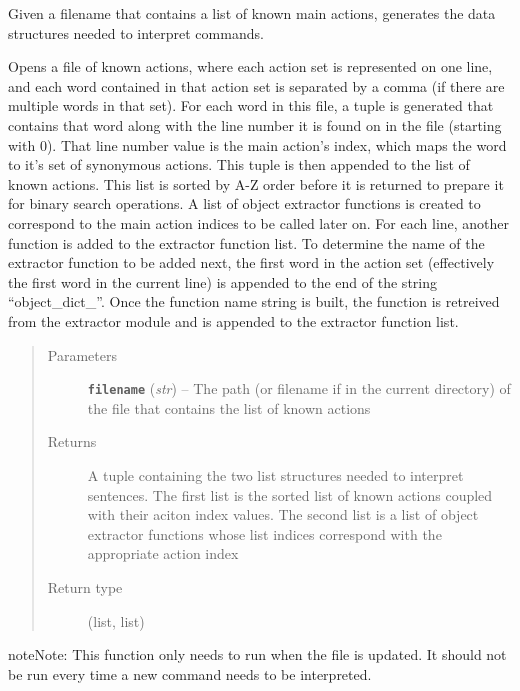 \documentclass[letterpaper,10pt,english]{sphinxmanual}
\begin{document}

\begin{fulllineitems}
\label{interpreter:interpreter.interpreter.build_action_structures}
Given a filename that contains a list of known main actions, generates the data structures needed to interpret commands.

Opens a file of known actions, where each action set is represented on one line, and each word contained in that action set is separated by a comma (if there are multiple words in that set). For each word in this file, a tuple is generated that contains that word along with the line number it is found on in the file (starting with 0). That line number value is the main action's index, which maps the word to it's set of synonymous actions. This tuple is then appended to the list of known actions. This list is sorted by A-Z order before it is returned to prepare it for binary search operations. A list of object extractor functions is created to correspond to the main action indices to be called later on. For each line, another function is added to the extractor function list. To determine the name of the extractor function to be added next, the first word in the action set (effectively the first word in the current line) is appended to the end of the string ``object\_dict\_''. Once the function name string is built, the function is retreived from the extractor module and is appended to the extractor function list.
\begin{quote}\begin{description}
\item[{Parameters}] \leavevmode
\textbf{\texttt{filename}} (\emph{str}) -- The path (or filename if in the current directory) of the file that contains the list of known actions

\item[{Returns}] \leavevmode
A tuple containing the two list structures needed to interpret sentences. The first list is the sorted list of known actions coupled with their aciton index values. The second list is a list of object extractor functions whose list indices correspond with the appropriate action index

\item[{Return type}] \leavevmode
(list, list)

\end{description}\end{quote}

\begin{notice}{note}{Note:}
This function only needs to run when the file is updated. It should not be run every time a new command needs to be interpreted.
\end{notice}

\end{fulllineitems}
\end{document}
